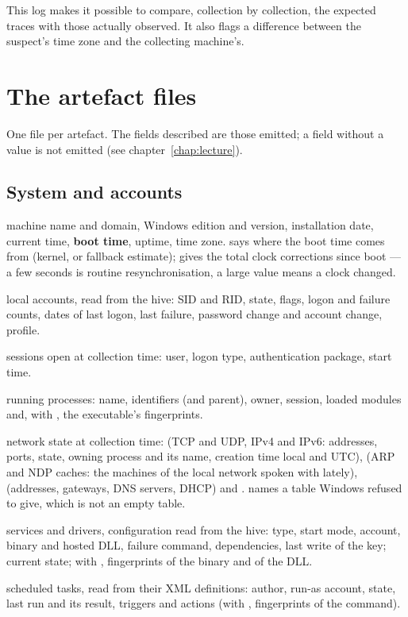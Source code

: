 \documentclass[11pt,a4paper,oneside]{report}
\begin{document}
This log makes it possible to compare, collection by collection, the expected
traces with those actually observed. It also flags a difference between the
suspect's time zone and the collecting machine's.

\section{The artefact files}

One file per artefact. The fields described are those emitted; a field without
a value is not emitted (see chapter~\ref{chap:lecture}).

\subsection{System and accounts}

\begin{description}[style=nextline,leftmargin=1.2em]
  \item[\fichier{OperatingSystem.json}] machine name and domain, Windows edition
        and version, installation date, current time, \textbf{boot time},
        uptime, time zone.  says where the boot time comes
        from (kernel, or fallback estimate); 
        gives the total clock corrections since boot — a few seconds is routine
        resynchronisation, a large value means a clock changed.
  \item[\fichier{users.json}] local accounts, read from the  hive:
        SID and RID, state, flags, logon and failure counts, dates of last
        logon, last failure, password change and account change, profile.
  \item[\fichier{Sessions.json}] sessions open at collection time: user, logon
        type, authentication package, start time.
  \item[\fichier{processes.json}] running processes: name, identifiers (and
        parent), owner, session, loaded modules and, with , the
        executable's fingerprints.
  \item[\fichier{network.json}] network state at collection time:
         (TCP and UDP, IPv4 and IPv6: addresses, ports,
        state, owning process and its name, creation time local and UTC),
         (ARP and NDP caches: the machines of the local network
        spoken with lately),  (addresses, gateways, DNS
        servers, DHCP) and .  names a table
        Windows refused to give, which is not an empty table.
  \item[\fichier{services.json}] services and drivers, configuration read from
        the hive: type, start mode, account, binary and hosted DLL, failure
        command, dependencies, last write of the key; current state; with
        , fingerprints of the binary and of the DLL.
  \item[\fichier{ScheduledTasks.json}] scheduled tasks, read from their XML
        definitions: author, run-as account, state, last run and its result,
        triggers and actions (with , fingerprints of the command).
\end{description}
\end{document}
